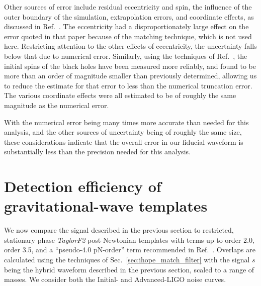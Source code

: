 Other sources of error include residual eccentricity and spin, the
influence of the outer boundary of the simulation, extrapolation
errors, and coordinate effects, as discussed in Ref.~\cite{Boyle2007}.
The eccentricity had a disproportionately large effect on the error
quoted in that paper because of the matching technique, which is not
used here.  Restricting attention to the other effects of
eccentricity, the uncertainty falls below that due to numerical error.
Similarly, using the techniques of Ref.~\cite{Lovelace2008}, the
initial spins of the black holes have been measured more reliably, and
found to be more than an order of magnitude smaller than previously
determined, allowing us to reduce the estimate for that error to less
than the numerical truncation error.  The various coordinate effects
were all estimated to be of roughly the same magnitude as the
numerical error.

With the numerical error being many times more accurate than needed
for this analysis, and the other sources of uncertainty being of
roughly the same size, these considerations indicate that the overall
error in our fiducial waveform is substantially less than the
precision needed for this analysis.


\section{Detection efficiency of gravitational-wave templates}
\label{sec:Efficiency} %

We now compare the signal described in the previous section to
restricted, stationary phase \textit{TaylorF2} post-Newtonian
templates with terms up to order 2.0, order 3.5, and a ``pseudo-4.0
pN-order'' term recommended in Ref.~\cite{Pan2007}.  Overlaps are
calculated using the techniques of Sec.~\ref{sec:ihope_match_filter}
with the signal $s$ being the hybrid waveform described in the
previous section, scaled to a range of masses.  We consider both the
Initial- and Advanced-LIGO noise curves.

